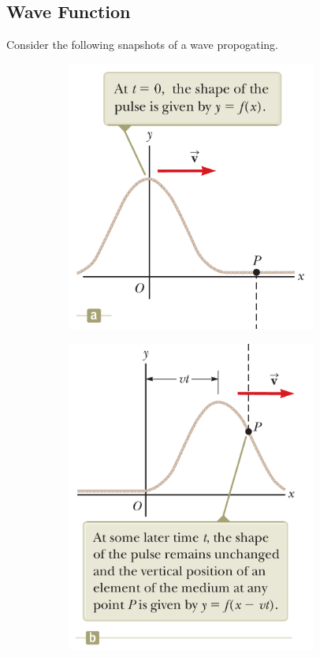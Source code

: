 \subsection{Wave Function}

Consider the following snapshots of a wave propogating.

\begin{figure}[h]
\centering
\begin{subfigure}{0.49\textwidth}
    \centering
    \includegraphics[width=0.9\textwidth]{images/oaw/fig16_5a.png}
\end{subfigure}
\begin{subfigure}{0.49\textwidth}
    \centering
    \includegraphics[width=0.9\textwidth]{images/oaw/fig16_5b.png}

\end{subfigure}
\end{figure}
